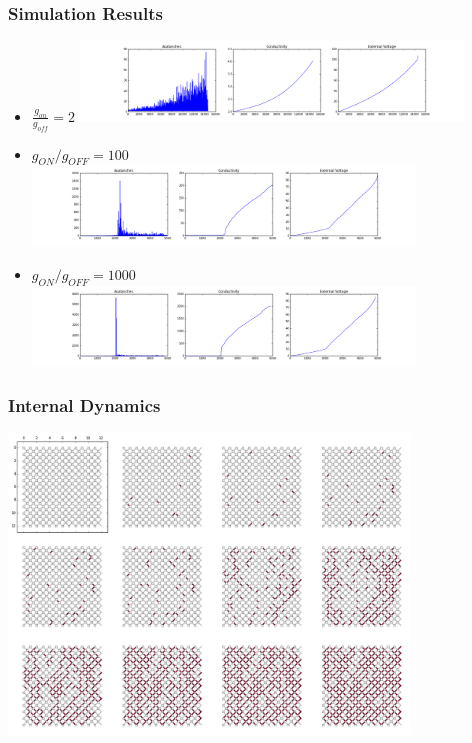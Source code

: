 \documentclass[mathserif]{beamer}
\begin{document}
\begin{frame}
\frametitle{Simulation Results}
\begin{itemize}
\item $\frac{g_{on}}{ g_{off}} = 2$
\includegraphics[width=0.8\textwidth]{ON2_run.png}
\item $g_{ON} / g_{OFF} = 100$
\includegraphics[width=0.8\textwidth]{ON100_run.png}
\item $g_{ON} / g_{OFF} = 1000$
\includegraphics[width=0.8\textwidth]{ON1000_run.png}
\end{itemize}
\end{frame}

\begin{frame}
\frametitle{Internal Dynamics}
\begin{center}
\includegraphics[width=0.8\textwidth]{Inside_a_network.png}
\end{center}
\end{frame}
\end{document}
